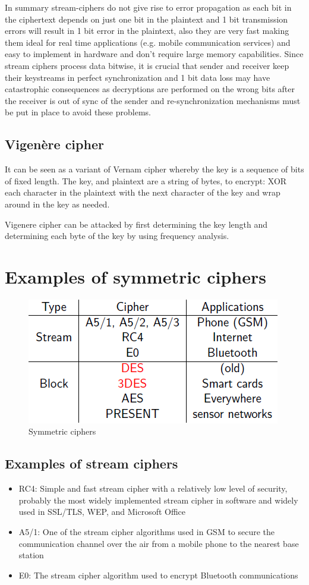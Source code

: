 In summary stream-ciphers do not give rise to error propagation as each bit in the ciphertext depends on just one bit in the plaintext and 1 bit transmission errors will result in 1 bit error in the plaintext, also they are very fast making them ideal for real time applications (e.g. mobile communication services) and easy to implement in hardware and don't require large memory capabilities. Since stream ciphers process data bitwise, it is crucial that sender and receiver keep their keystreams in perfect synchronization and 1 bit data loss may have catastrophic consequences as decryptions are performed on the wrong bits after the receiver is out of sync of the sender and re-synchronization mechanisms must be put in place to avoid these problems.


\subsection{Vigenère cipher}

It can be seen as a variant of Vernam cipher whereby the key is a sequence of bits of fixed length. The key, and plaintext are a string of bytes, to encrypt: XOR each character in the plaintext with the next character of the key and wrap around in the key as needed.

Vigenere cipher can be attacked by first determining the key length and determining each byte of the key by using frequency analysis.


\section{Examples of symmetric ciphers}

\begin{figure}
	\centering
	\includegraphics[width=0.4\linewidth]{Images/Chapter2/symmetric_encryption}
	\caption{Symmetric ciphers}
	\label{fig:symmetric_encryption}
\end{figure}

\subsection{Examples of stream ciphers}
\begin{itemize}
	\item RC4: Simple and fast stream cipher with a relatively low level of security, probably the most widely implemented stream cipher in software and widely used in SSL/TLS, WEP, and Microsoft Office
	\item A5/1: One of the stream cipher algorithms used in GSM to secure the communication channel over the air from a mobile phone to the nearest base station
	\item E0: The stream cipher algorithm used to encrypt Bluetooth communications
\end{itemize}

